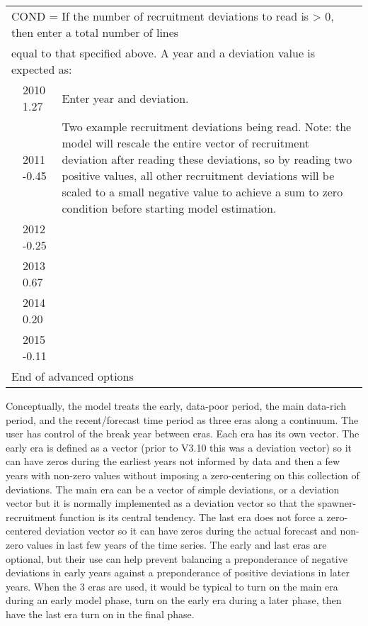 \begin{longtable}{p{1cm} p{3cm} p{11cm}}
	\multicolumn{3}{l}{COND = If the number of recruitment deviations to read is > 0, then enter a total number of lines} \Tstrut\\
	\multicolumn{3}{l}{equal to that specified above. A year and a deviation value is expected as:} \Bstrut\\
	& 2010 1.27 & Enter year and deviation. \\
	& 2011 -0.45 & \multirow{1}{1cm}[-0.25cm]{\parbox{11cm}{Two example recruitment deviations being read. Note: the model will rescale the entire vector of recruitment deviation after reading these deviations, so by reading two positive values, all other recruitment deviations will be scaled to a small negative value to achieve a sum to zero condition before starting model estimation.}} \\
	& 2012 -0.25 & \\
	& 2013 0.67 & \\
	& 2014 0.20 & \\
	& 2015 -0.11 & \Bstrut\\
	\hline
	
		
	\multicolumn{3}{l}{End of advanced options} \Tstrut\Bstrut\\
	\hline
	
\end{longtable}

Conceptually, the model treats the early, data-poor period, the main data-rich period, and the recent/forecast time period as three eras along a continuum. The user has control of the break year between eras. Each era has its own vector. The early era is defined as a vector (prior to V3.10 this was a deviation vector) so it can have zeros during the earliest years not informed by data and then a few years with non-zero values without imposing a zero-centering on this collection of deviations. The main era can be a vector of simple deviations, or a deviation vector but it is normally implemented as a deviation vector so that the spawner-recruitment function is its central tendency. The last era does not force a zero-centered deviation vector so it can have zeros during the actual forecast and non-zero values in last few years of the time series. The early and last eras are optional, but their use can help prevent balancing a preponderance of negative deviations in early years against a preponderance of positive deviations in later years. When the 3 eras are used, it would be typical to turn on the main era during an early model phase, turn on the early era during a later phase, then have the last era turn on in the final phase.

